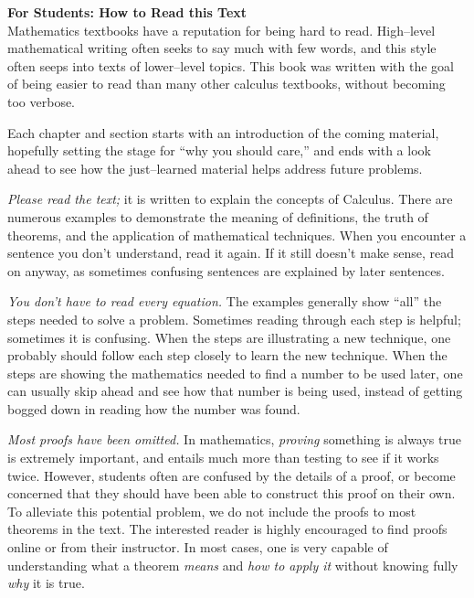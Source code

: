 
\noindent\textbf{\large For Students: How to Read this Text}\\

Mathematics textbooks have a reputation for being hard to read. High--level mathematical writing often seeks to say much with few words, and this style often seeps into texts of lower--level topics. This book was written with the goal of being easier to read than many other calculus textbooks, without becoming too verbose. 

Each chapter and section starts with an introduction of the coming material, hopefully setting the stage for ``why you should care,'' and ends with a look ahead to see how the just--learned material helps address future problems. 

\textit{Please read the text;} it is written to explain the concepts of Calculus. There are numerous examples to demonstrate the meaning of definitions, the truth of theorems, and the application of mathematical techniques. When you encounter a sentence you don't understand, read it again. If it still doesn't make sense, read on anyway, as sometimes confusing sentences are explained by later sentences.

\textit{You don't have to read every equation.} The examples generally show ``all'' the steps needed to solve a problem. Sometimes reading through each step is helpful; sometimes it is confusing. When the steps are illustrating a new technique, one probably should follow each step closely to learn the new technique. When the steps are showing the mathematics needed to find a number to be used later, one can usually skip ahead and see how that number is being used, instead of getting bogged down in reading how the number was found.

\textit{Most proofs have been omitted.} In mathematics, \textit{proving} something is always true is extremely important, and entails much more than testing to see if it works twice. However, students often are confused by the details of a proof, or become concerned that they should have been able to construct this proof on their own. To alleviate this potential problem, we do not include the proofs to most theorems in the text. The interested reader is highly encouraged to find proofs online or from their instructor. In most cases, one is very capable of understanding what a theorem \textit{means} and \textit{how to apply it} without knowing fully \textit{why} it is true.
\\

